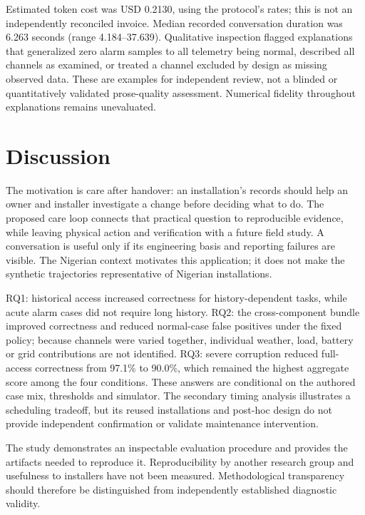 \documentclass[11pt,a4paper]{article}
\begin{document}
Estimated token cost was USD 0.2130, using the protocol's rates; this is not an independently reconciled invoice. Median recorded conversation duration was 6.263 seconds (range 4.184--37.639). Qualitative inspection flagged explanations that generalized zero alarm samples to all telemetry being normal, described all channels as examined, or treated a channel excluded by design as missing observed data. These are examples for independent review, not a blinded or quantitatively validated prose-quality assessment. Numerical fidelity throughout explanations remains unevaluated.


\FloatBarrier
\section{Discussion}

The motivation is care after handover: an installation's records should help an owner and installer investigate a change before deciding what to do. The proposed care loop connects that practical question to reproducible evidence, while leaving physical action and verification with a future field study. A conversation is useful only if its engineering basis and reporting failures are visible. The Nigerian context motivates this application; it does not make the synthetic trajectories representative of Nigerian installations.


RQ1: historical access increased correctness for history-dependent tasks, while acute alarm cases did not require long history. RQ2: the cross-component bundle improved correctness and reduced normal-case false positives under the fixed policy; because channels were varied together, individual weather, load, battery or grid contributions are not identified. RQ3: severe corruption reduced full-access correctness from 97.1\% to 90.0\%, which remained the highest aggregate score among the four conditions. These answers are conditional on the authored case mix, thresholds and simulator. The secondary timing analysis illustrates a scheduling tradeoff, but its reused installations and post-hoc design do not provide independent confirmation or validate maintenance intervention.


The study demonstrates an inspectable evaluation procedure and provides the artifacts needed to reproduce it. Reproducibility by another research group and usefulness to installers have not been measured. Methodological transparency should therefore be distinguished from independently established diagnostic validity.
\end{document}
